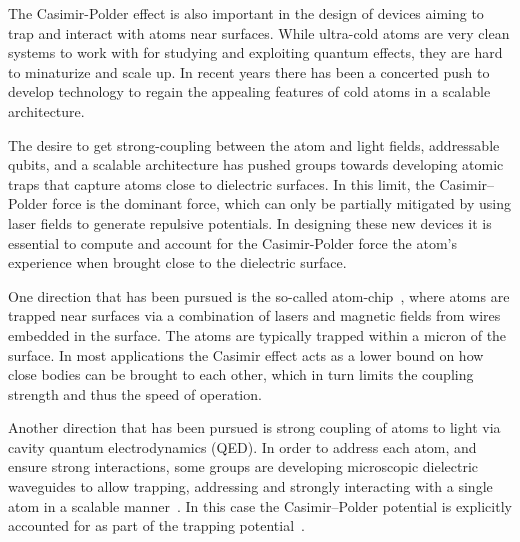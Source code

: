 
    The Casimir-Polder effect is also important in the design of devices aiming to trap and interact
    with atoms near surfaces.  While ultra-cold atoms are very clean systems to work with for 
    studying and exploiting quantum effects, they are hard to minaturize and scale up.  In recent
    years there has been a concerted push to develop technology to regain the appealing features 
    of cold atoms in a scalable architecture. 

The desire to get strong-coupling between the atom and light fields, addressable qubits, and a scalable
architecture has pushed groups towards developing atomic traps that capture atoms close to dielectric surfaces.  
In this limit, the Casimir--Polder force is the dominant force, which can only be partially mitigated
by using laser fields to generate repulsive potentials.
  In designing these new devices it is essential to compute and account for the Casimir-Polder force
the atom's experience when brought close to the dielectric surface.  

    One direction that has been pursued is the so-called atom-chip~\cite{Folman2000,Schneider2003},
    where atoms are trapped near surfaces via a combination of lasers and magnetic fields from wires embedded in
    the surface.  The atoms are typically trapped within a micron of the surface.  
    In most applications the Casimir effect acts as a lower bound on how close bodies can be brought 
    to each other, which in turn limits the coupling strength and thus the speed of operation.  

    Another direction that has been pursued is strong coupling of atoms to light via cavity 
    quantum electrodynamics (QED).  
    In order to address each atom, and ensure strong interactions, some groups 
    are developing microscopic dielectric waveguides to allow trapping, addressing and strongly interacting with a 
    single atom in a scalable manner~\cite{Alton2011, Hung2013, Goban2014}.  In this case
    the Casimir--Polder potential is explicitly accounted for as part of the trapping potential~\cite{Goban2014}.
    
